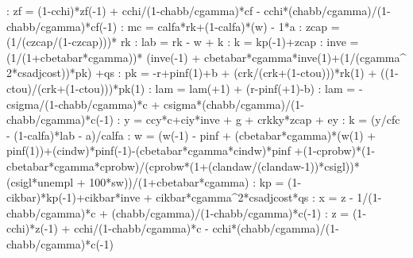 \documentclass{article}%
\begin{document}
   :  zf = (1{-}cchi)*zf({-}1) + cchi/(1{-}chabb/cgamma)*cf {-} cchi*(chabb/cgamma)/(1{-}chabb/cgamma)*cf({-}1)\newline%
   :  mc =  calfa*rk+(1{-}calfa)*(w) {-} 1*a\newline%
   :  zcap =  (1/(czcap/(1{-}czcap)))* rk\newline%
   :  lab = rk {-} w + k\newline%
   :  k =  kp({-}1)+zcap\newline%
   :  inve = (1/(1+cbetabar*cgamma))* (inve({-}1) + cbetabar*cgamma*inve(1)+(1/(cgamma\^{} 2*csadjcost))*pk) +qs\newline%
   :  pk = {-}r+pinf(1)+b + (crk/(crk+(1{-}ctou)))*rk(1) +  ((1{-}ctou)/(crk+(1{-}ctou)))*pk(1)\newline%
   :  lam = lam(+1) + (r{-}pinf(+1){-}b)\newline%
   :  lam = {-}csigma/(1{-}chabb/cgamma)*c + csigma*(chabb/cgamma)/(1{-}chabb/cgamma)*c({-}1)\newline%
   :  y = ccy*c+ciy*inve + g + crkky*zcap  + ey\newline%
   :  k = (y/cfc {-} (1{-}calfa)*lab {-} a)/calfa\newline%
   :  w = (w({-}1) {-} pinf + (cbetabar*cgamma)*(w(1) + pinf(1))+(cindw)*pinf({-}1){-}(cbetabar*cgamma*cindw)*pinf +(1{-}cprobw)*(1{-}cbetabar*cgamma*cprobw)/(cprobw*(1+(clandaw/(clandaw{-}1))*csigl))*(csigl*unempl + 100*sw))/(1+cbetabar*cgamma)\newline%
   :  kp =  (1{-}cikbar)*kp({-}1)+cikbar*inve + cikbar*cgamma\^{}2*csadjcost*qs\newline%
   :  x = z {-} 1/(1{-}chabb/cgamma)*c + (chabb/cgamma)/(1{-}chabb/cgamma)*c({-}1)\newline%
   :  z = (1{-}cchi)*z({-}1) + cchi/(1{-}chabb/cgamma)*c {-} cchi*(chabb/cgamma)/(1{-}chabb/cgamma)*c({-}1)\newline%
\end{document}
